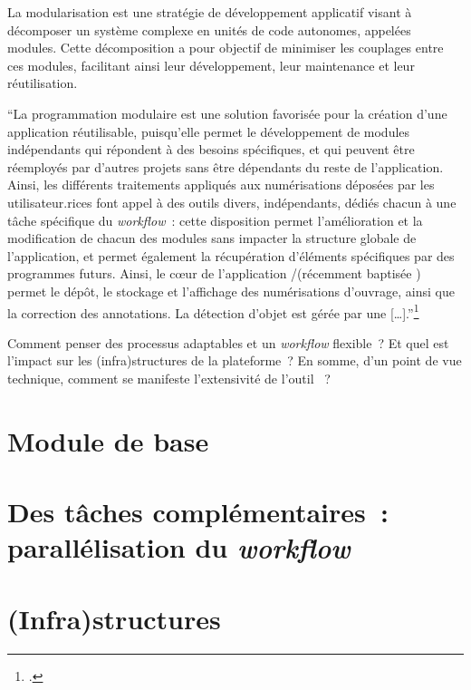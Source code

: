

La modularisation est une stratégie de développement applicatif visant à
décomposer un système complexe en unités de code autonomes, appelées
modules. Cette décomposition a pour objectif de minimiser les couplages
entre ces modules, facilitant ainsi leur développement, leur maintenance
et leur réutilisation.

\begin{kwote}
``La programmation modulaire est une solution favorisée pour la création
d'une application réutilisable, puisqu'elle permet le développement de
modules indépendants qui répondent à des besoins spécifiques, et qui
peuvent être réemployés par d'autres projets sans être dépendants du
reste de l'application. Ainsi, les différents traitements appliqués aux
numérisations déposées par les utilisateur.rices font appel à des outils
divers, indépendants, dédiés chacun à une tâche spécifique du \textit{workflow}~:
cette disposition permet l'amélioration et la modification de chacun des
modules sans impacter la structure globale de l'application, et permet
également la récupération d'éléments spécifiques par des programmes
futurs. Ainsi, le cœur de l'application \eida/\vhs (récemment baptisée \aikon) permet le dépôt, le
stockage et l'aﬀichage des numérisations d'ouvrage, ainsi que la
correction des annotations. La détection d'objet est gérée par une \api
{[}\ldots{]}.''\footcite[p.52]{norindr_traitement_2023}
\end{kwote}

Comment penser des processus adaptables et un \textit{workflow} flexible~? Et
quel est l'impact sur les (infra)structures de la plateforme~? En somme,
d'un point de vue technique, comment se manifeste
l'extensivité de l'outil \aikon~?

\hypertarget{module-de-base}{%
\section{Module de base}\label{module-de-base}}



\hypertarget{les-taches}{%
\section{Des tâches complémentaires~: parallélisation du
\emph{workflow}}\label{les-taches}}



\hypertarget{infrastructures}{%
\section{(Infra)structures}\label{infrastructures}}

